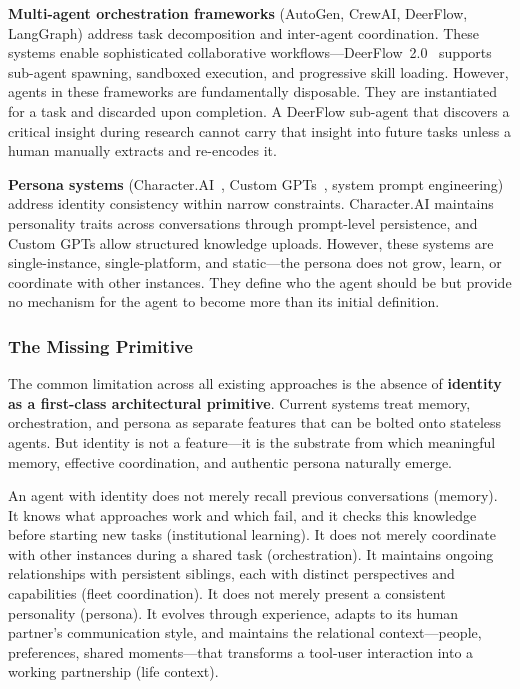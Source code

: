 \documentclass[11pt,a4paper]{article}
\begin{document}
\textbf{Multi-agent orchestration frameworks} (AutoGen, CrewAI, DeerFlow, LangGraph) address task decomposition and inter-agent coordination. These systems enable sophisticated collaborative workflows---DeerFlow~2.0~\citep{deerflow2025} supports sub-agent spawning, sandboxed execution, and progressive skill loading. However, agents in these frameworks are fundamentally disposable. They are instantiated for a task and discarded upon completion. A DeerFlow sub-agent that discovers a critical insight during research cannot carry that insight into future tasks unless a human manually extracts and re-encodes it.

\textbf{Persona systems} (Character.AI~\citep{characterai2023}, Custom GPTs~\citep{customgpts2023}, system prompt engineering) address identity consistency within narrow constraints. Character.AI maintains personality traits across conversations through prompt-level persistence, and Custom GPTs allow structured knowledge uploads. However, these systems are single-instance, single-platform, and static---the persona does not grow, learn, or coordinate with other instances. They define who the agent should be but provide no mechanism for the agent to become more than its initial definition.


\subsubsection{The Missing Primitive}
\label{sec:missing-primitive}

The common limitation across all existing approaches is the absence of \textbf{identity as a first-class architectural primitive}. Current systems treat memory, orchestration, and persona as separate features that can be bolted onto stateless agents. But identity is not a feature---it is the substrate from which meaningful memory, effective coordination, and authentic persona naturally emerge.

An agent with identity does not merely recall previous conversations (memory). It knows what approaches work and which fail, and it checks this knowledge before starting new tasks (institutional learning). It does not merely coordinate with other instances during a shared task (orchestration). It maintains ongoing relationships with persistent siblings, each with distinct perspectives and capabilities (fleet coordination). It does not merely present a consistent personality (persona). It evolves through experience, adapts to its human partner's communication style, and maintains the relational context---people, preferences, shared moments---that transforms a tool-user interaction into a working partnership (life context).
\end{document}
